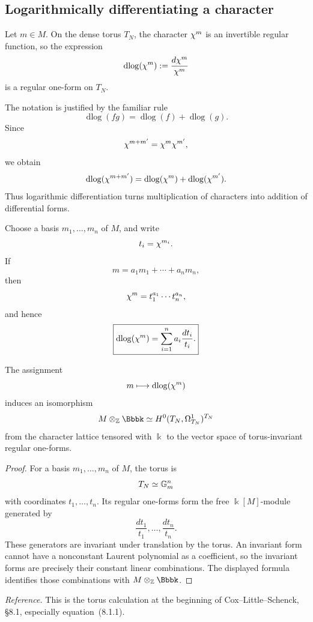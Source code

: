 \subsection{Logarithmically differentiating a character}

Let \(m\in M\). On the dense torus \(T_N\), the character
\(\chi^{m}\) is an invertible regular function, so the expression
\[
\operatorname{dlog}(\chi^{m})
:=
\frac{d\chi^{m}}{\chi^{m}}
\]
is a regular one-form on \(T_N\).

The notation is justified by the familiar rule
\[
\operatorname{dlog}(fg)
=
\operatorname{dlog}(f)+\operatorname{dlog}(g).
\]
Since
\[
\chi^{m+m'}=\chi^{m}\chi^{m'},
\]
we obtain
\[
\operatorname{dlog}(\chi^{m+m'})
=
\operatorname{dlog}(\chi^{m})
+
\operatorname{dlog}(\chi^{m'}).
\]
Thus logarithmic differentiation turns multiplication of characters
into addition of differential forms.

Choose a basis \(m_1,\dots,m_n\) of \(M\), and write
\[
t_i=\chi^{m_i}.
\]
If
\[
m=a_1m_1+\cdots+a_nm_n,
\]
then
\[
\chi^{m}=t_1^{a_1}\cdots t_n^{a_n},
\]
and hence
\[
\boxed{
\operatorname{dlog}(\chi^{m})
=
\sum_{i=1}^n a_i\frac{dt_i}{t_i}.
}
\]

\begin{proposition}
\label{prop:invariant-one-forms-torus}
The assignment
\[
m\longmapsto
\operatorname{dlog}(\chi^{m})
\]
induces an isomorphism
\[
M\otimes_\ZZ\Bbbk
\simeq
H^0(T_N,\Omega^1_{T_N})^{T_N}
\]
from the character lattice tensored with \(\Bbbk\) to the vector
space of torus-invariant regular one-forms.
\end{proposition}

\begin{proof}
For a basis \(m_1,\dots,m_n\) of \(M\), the torus is
\[
T_N\simeq\mathbb{G}_{m}^n
\]
with coordinates \(t_1,\dots,t_n\). Its regular one-forms form the
free \(\Bbbk[M]\)-module generated by
\[
\frac{dt_1}{t_1},\dots,\frac{dt_n}{t_n}.
\]
These generators are invariant under translation by the torus. An
invariant form cannot have a nonconstant Laurent polynomial as a
coefficient, so the invariant forms are precisely their constant
linear combinations. The displayed formula identifies those
combinations with \(M\otimes_\ZZ\Bbbk\).
\end{proof}

\noindent
\textit{Reference.}
This is the torus calculation at the beginning of
Cox--Little--Schenck, \S8.1, especially equation~(8.1.1).

